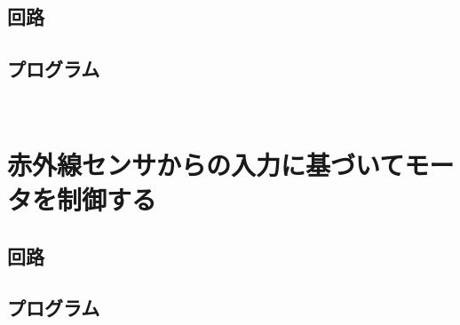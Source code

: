 \documentclass[11pt,a4paper]{jarticle}
\begin{document}
\subsection*{回路}

\subsection*{プログラム}
\begin{lstlisting}
 
\end{lstlisting}

\section{赤外線センサからの入力に基づいてモータを制御する}

\subsection*{回路}

\subsection*{プログラム}
\begin{lstlisting}
 
\end{lstlisting}
\end{document}
